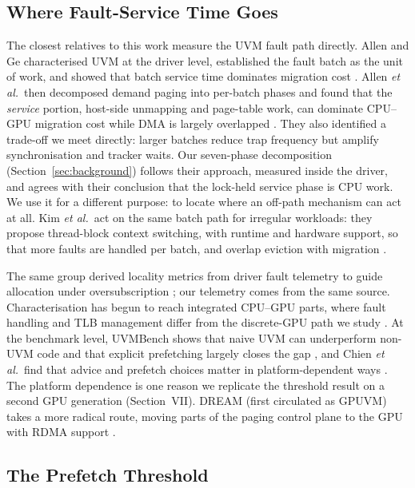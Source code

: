\subsection{Where Fault-Service Time Goes}

The closest relatives to this work measure the UVM fault path directly.
Allen and Ge characterised UVM at the driver level, established the fault
batch as the unit of work, and showed that batch service time dominates
migration cost \cite{allen2021indepth}. Allen \emph{et al.}\ then decomposed
demand paging into per-batch phases and found that the \emph{service}
portion, host-side unmapping and page-table work, can dominate CPU--GPU
migration cost while DMA is largely overlapped \cite{allen2024finegrain}. They
also identified a trade-off we meet directly: larger batches reduce trap
frequency but amplify synchronisation and tracker waits. Our seven-phase
decomposition (Section~\ref{sec:background}) follows their approach, measured
inside the driver, and agrees with their conclusion that the lock-held service
phase is CPU work. We use it for a different purpose: to locate where an
off-path mechanism can act at all. Kim \emph{et al.}\ act on the same batch
path for irregular workloads: they propose thread-block context switching, with
runtime and hardware support, so that more faults are handled per batch, and
overlap eviction with migration \cite{kim2020batchaware}.

The same group derived locality metrics from driver fault telemetry to guide
allocation under oversubscription \cite{jones2025helm}; our telemetry comes
from the same source. Characterisation has begun to reach integrated CPU--GPU
parts, where fault handling and TLB management differ from the discrete-GPU
path we study \cite{wahlgren2025mi300a}. At the benchmark level, UVMBench shows
that naive UVM can underperform non-UVM code and that explicit prefetching
largely closes the gap \cite{gu2020uvmbench}, and Chien \emph{et al.}\ find that
advice and prefetch choices matter in platform-dependent ways
\cite{chien2019umfeatures}. The platform dependence is one reason we replicate
the threshold result on a second GPU generation (Section~VII). DREAM (first circulated as GPUVM) takes a
more radical route, moving parts of the paging control plane to the GPU with
RDMA support \cite{nazaraliyev2024gpuvm}.

\subsection{The Prefetch Threshold}

